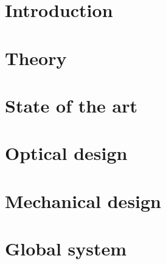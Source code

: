 \documentclass[
    iai, %
    mi, %
]{heig-tb}
\begin{document}
\maketitle
\frontmatter
\clearemptydoublepage



\preamble
\Authentication

\begin{abstract}
    
\end{abstract}

\clearemptydoublepage

{
    \tableofcontents
    \let\cleardoublepage\clearpage
    \listoffigures
    \let\cleardoublepage\clearpage
    \listoftables
    \let\cleardoublepage\clearpage
    \listoflistings
}

\printnomenclature
\clearemptydoublepage

\printglossaries
\clearemptydoublepage


\mainmatter
\chapter{Introduction}


\chapter{Theory}


\chapter{State of the art}


\chapter{Optical design}


\chapter{Mechanical design}


\chapter{Global system}

\end{document}
